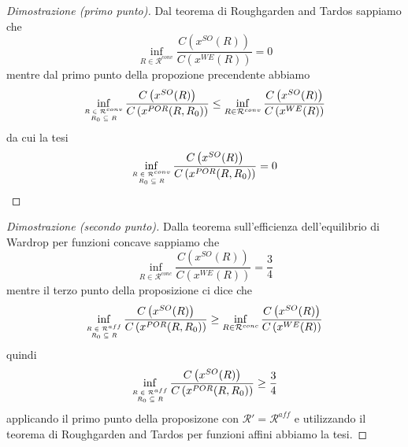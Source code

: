 \documentclass{beamer}
\theoremstyle{plain}
\theoremstyle{definition}
\theoremstyle{remark}
\newcommand{\pa}[1]{\left(#1\right)}
\begin{document}
\begin{frame}
  \begin{proof}[Dimostrazione (primo punto)]
    Dal teorema di Roughgarden and Tardos sappiamo che 
    \[ \inf _{R\in \mathcal{R}^{conv}} \frac{C\pa{ x^{SO}(R)}}{C\pa{
          x^{WE}(R)}} = 0 \]
    mentre dal primo punto della propozione precendente abbiamo
    \[ \inf _{\tiny\begin{matrix}R\in \mathcal{R}^{conv}\\R_0\subseteq
          R\end{matrix}}
      \frac{C\pa{x^{SO}(R)}}{C\pa{x^{POR}(R,R_0)}} \le
      \inf _{R\in \mathcal{R}^{conv}}
      \frac{C\pa{x^{SO}(R)}}{C\pa{x^{WE}(R)}}
    \]
    da cui la tesi
    \[ \inf _{\tiny\begin{matrix}R\in \mathcal{R}^{conv}\\R_0\subseteq
        R\end{matrix}}
    \frac{C\pa{x^{SO}(R)}}{C\pa{x^{POR}(R,R_0)}} = 0\]    
  \end{proof}
\end{frame}

\begin{frame}
  \begin{proof}[Dimostrazione (secondo punto)]
    Dalla teorema sull'efficienza dell'equilibrio di Wardrop per
    funzioni concave sappiamo che
    \[ \inf _{R\in \mathcal{R}^{conc}} \frac{C\pa{ x^{SO}(R)}}{C\pa{
          x^{WE}(R)}} = \frac{3}{4} \]
    mentre il terzo punto della proposizione ci dice che
    \[ \inf _{\tiny\begin{matrix}R\in \mathcal{R}^{aff}\\R_0\subseteq
          R\end{matrix}}
      \frac{C\pa{x^{SO}(R)}}{C\pa{x^{POR}(R,R_0)}} \ge
      \inf _{R\in \mathcal{R}^{conc}}
      \frac{C\pa{x^{SO}(R)}}{C\pa{x^{WE}(R)}}
    \]
    quindi
    \[ \inf _{\tiny\begin{matrix}R\in \mathcal{R}^{aff}\\R_0\subseteq
          R\end{matrix}}
      \frac{C\pa{x^{SO}(R)}}{C\pa{x^{POR}(R,R_0)}} \ge \frac{3}{4} \]    
    applicando il primo punto della proposizone con $\mathcal{R}' =
    \mathcal{R}^{aff}$ e utilizzando il teorema di Roughgarden and
    Tardos per funzioni affini abbiamo la tesi.
  \end{proof}
\end{frame}
\end{document}
